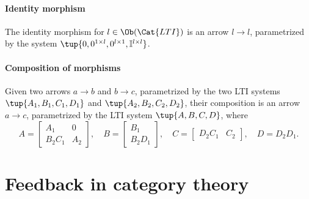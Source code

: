 \paragraph{Identity morphism}
The identity morphism for $l\in \Ob(\Cat{LTI})$ is an arrow $l\to l$, parametrized by the system $\tup{0,0^{1\times l},0^{l\times 1},\mathbb{I}^{l\times l}}$.
\paragraph{Composition of morphisms}
Given two arrows $a\to b$ and $b\to c$, parametrized by the two LTI systems $\tup{A_1,B_1,C_1,D_1}$ and $\tup{A_2,B_2,C_2,D_2}$, their composition is an arrow $a\to c$, parametrized by the LTI system $\tup{A,B,C,D}$, where
\begin{equation}
    A=\begin{bmatrix}
    A_1&0\\
    B_2C_1&A_2
    \end{bmatrix},\quad
    B=\begin{bmatrix}
    B_1\\
    B_2D_1
    \end{bmatrix},\quad 
    C=\begin{bmatrix}
    D_2C_1&C_2
    \end{bmatrix}, \quad
    D=D_2D_1.
\end{equation}
\section{Feedback in category theory}
\label{sec:feedbackindesign}



